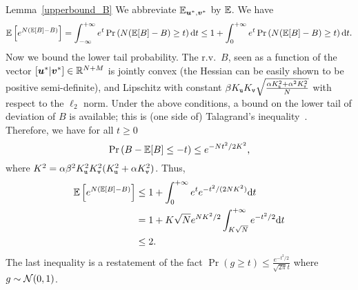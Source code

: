 \documentclass[final,12pt]{colt2018} %
\newcommand{\utt}{\textup{\texttt{u}}}
\newcommand{\vtt}{\textup{\texttt{v}}}
\renewcommand{\u}{\bm{u}}
\renewcommand{\v}{\bm{v}}
\begin{document}
\vspace{.3cm}
\noindent\begin{proofof}{Lemma~\ref{upperbound_B}}
We abbreviate $\E_{\u^*,\v^*}$ by $\operatorname{\mathbb{E}}$. We have
\[\operatorname{\mathbb{E}}\left[e^{N(\operatorname{\mathbb{E}} [B] - B)}\right] = \int_{-\infty}^{+\infty} e^t \Pr\left(N(\operatorname{\mathbb{E}} [B] - B) \ge t\right) \mathrm{d} t \le 1+ \int_0^{+\infty} e^t \Pr\left(N(\operatorname{\mathbb{E}} [B] - B) \ge t\right)\mathrm{d} t. \]
Now we bound the lower tail probability. The r.v.\ $B$, seen as a function of the vector $[\u^*|\v^*] \in \R^{N+M}$ is jointly convex (the Hessian can be easily shown to be positive semi-definite), and Lipschitz with constant $\beta K_\utt K_\vtt\sqrt{\frac{\alpha K_\utt^2+\alpha^2K_\vtt^2}{N}}$ with respect to the $\ell_2$ norm. Under the above conditions, a bound on the lower tail of deviation of $B$  is available; this is (one side of) Talagrand's inequality~\citep[see][Theorem 7.12]{boucheron2013concentration}. Therefore, we have for all $t\ge 0$
\[\Pr\left( B - \operatorname{\mathbb{E}} [B]\le -t\right)\le e^{-Nt^2/2K^2},\] 
where $K^2 = \alpha\beta^2K_\utt^2 K_\vtt^2( K_\utt^2+\alpha K_\vtt^2)$. Thus,
\begin{align*}
\operatorname{\mathbb{E}}\left[e^{N(\operatorname{\mathbb{E}} [B] - B)}\right] &\le 1+ \int_0^{+\infty} e^t e^{-t^2/(2NK^2)}\mathrm{d} t\\
&= 1+ K\sqrt{N}e^{NK^2/2} \int_{K\sqrt{N}}^{+\infty} e^{-t^2/2}\mathrm{d} t\\
&\le 2. 
\end{align*}
The last inequality is a restatement of the fact $\Pr( g \ge t) \le \frac{e^{-t^2/2}}{\sqrt{2\pi}t}$ where $g \sim \mathcal{N}(0,1)$.
\end{proofof}
\end{document}

